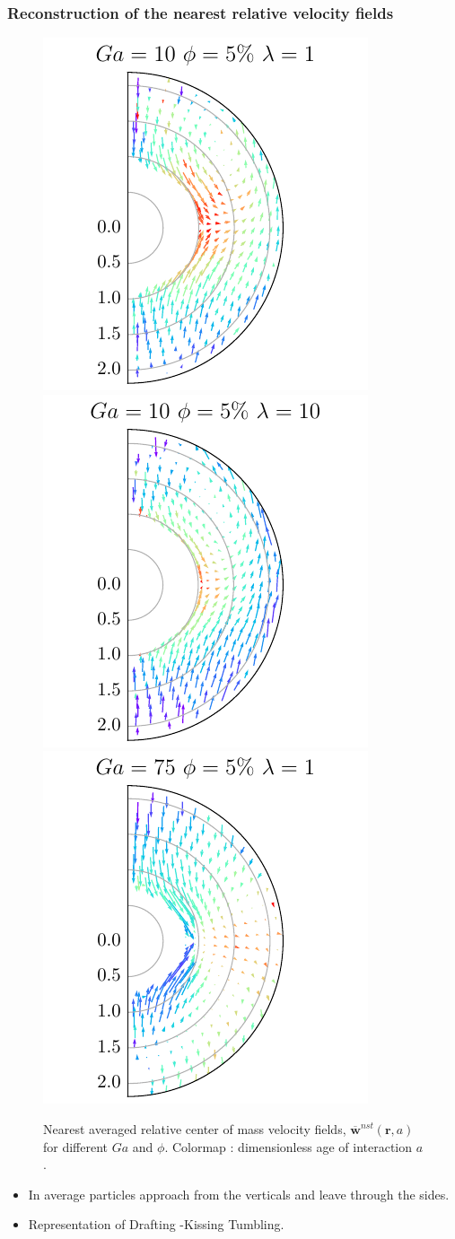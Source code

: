 \documentclass{sintefbeamer}
\newcommand{\nstavg}[1]{\overline{#1}^{nst}}
\begin{document}
\begin{frame}
  \frametitle{Reconstruction of the nearest relative velocity fields}

  \begin{figure}
    
    \includegraphics[height=0.35\textwidth]{image/HOMOGENEOUS/fDrop/U_rel_l_1_Ga_10_PHI_5.pdf}
    \includegraphics[height=0.35\textwidth]{image/HOMOGENEOUS/fDrop/U_rel_l_10_Ga_10_PHI_5.pdf}
    \includegraphics[height=0.35\textwidth]{image/HOMOGENEOUS/fDrop/U_rel_l_1_Ga_75_PHI_5.pdf}
    
    \caption{Nearest averaged relative center of mass velocity fields, $\nstavg{\textbf{w}} (\textbf{r},a)$ for different $Ga$ and $\phi$. 
    Colormap : dimensionless age of interaction $a$. }
  \end{figure}

\begin{itemize}
  \item In average particles approach from the verticals and leave through the sides. 
  \item Representation of Drafting -Kissing Tumbling. 
\end{itemize}
\end{frame}
\end{document}
